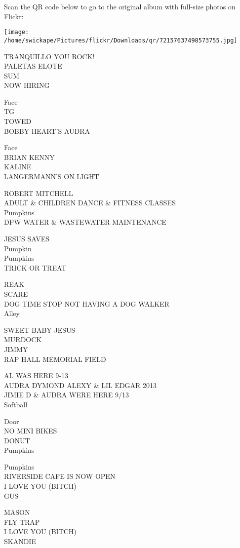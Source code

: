 \documentclass[10pt,letterpaper]{article}
\begin{document}
Scan the QR code below to go to the original album with full-size photos on Flickr:

\texttt{[image: /home/swickape/Pictures/flickr/Downloads/qr/72157637498573755.jpg]}


TRANQUILLO YOU ROCK!\\
PALETAS ELOTE\\
SUM\\
NOW HIRING

Face\\
TG\\
TOWED\\
BOBBY HEART'S AUDRA

Face\\
BRIAN KENNY\\
KALINE\\
LANGERMANN'S ON LIGHT

ROBERT MITCHELL\\
ADULT \& CHILDREN DANCE \& FITNESS CLASSES\\
Pumpkins\\
DPW WATER \& WASTEWATER MAINTENANCE

JESUS SAVES\\
Pumpkin\\
Pumpkins\\
TRICK OR TREAT

REAK\\
SCARE\\
DOG TIME STOP NOT HAVING A DOG WALKER\\
Alley

SWEET BABY JESUS\\
MURDOCK\\
JIMMY\\
RAP HALL MEMORIAL FIELD

AL WAS HERE 9{-}13\\
AUDRA DYMOND ALEXY \& LIL EDGAR 2013\\
JIMIE D \& AUDRA WERE HERE 9/13\\
Softball

Door\\
NO MINI BIKES\\
DONUT\\
Pumpkins

Pumpkins\\
RIVERSIDE CAFE IS NOW OPEN\\
I LOVE YOU (BITCH)\\
GUS

MASON\\
FLY TRAP\\
I LOVE YOU (BITCH)\\
SKANDIE
\end{document}
